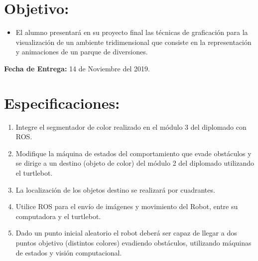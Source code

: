 \documentclass[12pt,letterpaper]{article}
\begin{document}
\section*{Objetivo:}
\begin{itemize}
\item El alumno presentará en su proyecto final las t\'ecnicas de graficación para la visualizaci\'on de un ambiente tridimensional que consiste en la representaci\'on y animaciones de un parque de diversiones.
\end{itemize}

\textbf{Fecha de Entrega:} 14 de Noviembre del 2019.


\section*{Especificaciones:}

\begin{enumerate}
\item Integre el segmentador de color realizado en el m\'odulo 3 del diplomado con ROS.
\item Modifique la m\'aquina de estados del comportamiento que evade obst\'aculos y se dirige a un destino (objeto de color) del m\'odulo 2 del diplomado utilizando el turtlebot.
\item La localizaci\'on de los objetos destino se realizar\'a por cuadrantes.
\item Utilice ROS para el env\'io de im\'agenes y movimiento del Robot, entre su computadora y el turtlebot.
\item Dado un punto inicial aleatorio el robot deber\'a ser capaz de llegar a dos puntos objetivo (distintos colores) evadiendo obst\'aculos, utilizando m\'aquinas de estados y visi\'on computacional.
\end{enumerate}
\end{document}
